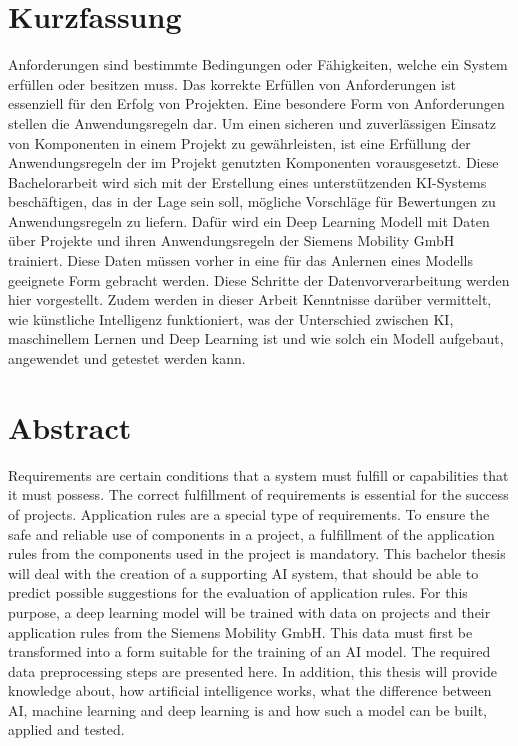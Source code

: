 \section*{Kurzfassung}
Anforderungen sind bestimmte Bedingungen oder Fähigkeiten, welche ein System erfüllen oder besitzen muss. Das korrekte Erfüllen von Anforderungen ist essenziell für den Erfolg von Projekten.
Eine besondere Form von Anforderungen stellen die Anwendungsregeln dar. Um einen sicheren und zuverlässigen Einsatz von Komponenten in einem Projekt zu gewährleisten,
ist eine Erfüllung der Anwendungsregeln der im Projekt genutzten Komponenten vorausgesetzt. Diese Bachelorarbeit wird sich mit der Erstellung eines unterstützenden KI-Systems beschäftigen,
das in der Lage sein soll, mögliche Vorschläge für Bewertungen zu Anwendungsregeln zu liefern. Dafür wird ein Deep Learning Modell mit Daten über Projekte und 
ihren Anwendungsregeln der Siemens Mobility GmbH trainiert. Diese Daten müssen vorher in eine für das Anlernen eines Modells geeignete Form 
gebracht werden. Diese Schritte der Datenvorverarbeitung werden hier vorgestellt. Zudem werden in dieser Arbeit Kenntnisse darüber vermittelt, 
wie künstliche Intelligenz funktioniert, was der Unterschied zwischen KI, maschinellem Lernen und Deep Learning ist und wie solch ein Modell aufgebaut, angewendet und getestet werden kann. 

\vfill\vfill\vfill\vfill\vfill\vfill
\section*{Abstract}
Requirements are certain conditions that a system must fulfill or capabilities that it must possess. The correct fulfillment of requirements is essential for the success of projects.
Application rules are a special type of requirements. To ensure the safe and reliable use of components in a project,
a fulfillment of the application rules from the components used in the project is mandatory. This bachelor thesis will deal with the creation of a supporting AI system,
that should be able to predict possible suggestions for the evaluation of application rules. For this purpose, a deep learning model will be trained with data on projects and 
their application rules from the Siemens Mobility GmbH. This data must first be transformed into a form suitable for the training of an AI model. 
The required data preprocessing steps are presented here. In addition, this thesis will provide knowledge about, 
how artificial intelligence works, what the difference between AI, machine learning and deep learning is and how such a model can be built, applied and tested.
\vfill\vfill\vfill\vfill\vfill\vfill